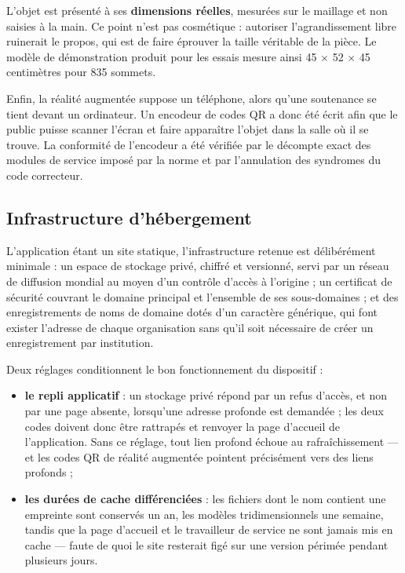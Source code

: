 L'objet est présenté à ses \textbf{dimensions réelles}, mesurées sur le maillage
et non saisies à la main. Ce point n'est pas cosmétique : autoriser
l'agrandissement libre ruinerait le propos, qui est de faire éprouver la taille
véritable de la pièce. Le modèle de démonstration produit pour les essais mesure
ainsi 45 $\times$ 52 $\times$ 45 centimètres pour 835 sommets.

Enfin, la réalité augmentée suppose un téléphone, alors qu'une soutenance se
tient devant un ordinateur. Un encodeur de codes QR a donc été écrit afin que le
public puisse scanner l'écran et faire apparaître l'objet dans la salle où il se
trouve. La conformité de l'encodeur a été vérifiée par le décompte exact des
modules de service imposé par la norme et par l'annulation des syndromes du code
correcteur.

\subsection{Infrastructure d'hébergement}

L'application étant un site statique, l'infrastructure retenue est délibérément
minimale : un espace de stockage privé, chiffré et versionné, servi par un
réseau de diffusion mondial au moyen d'un contrôle d'accès à l'origine ; un
certificat de sécurité couvrant le domaine principal et l'ensemble de ses
sous-domaines ; et des enregistrements de noms de domaine dotés d'un caractère
générique, qui font exister l'adresse de chaque organisation sans qu'il soit
nécessaire de créer un enregistrement par institution.

Deux réglages conditionnent le bon fonctionnement du dispositif :

\begin{itemize}
  \item \textbf{le repli applicatif} : un stockage privé répond par un refus
        d'accès, et non par une page absente, lorsqu'une adresse profonde est
        demandée ; les deux codes doivent donc être rattrapés et renvoyer la
        page d'accueil de l'application. Sans ce réglage, tout lien profond
        échoue au rafraîchissement — et les codes QR de réalité augmentée
        pointent précisément vers des liens profonds ;
  \item \textbf{les durées de cache différenciées} : les fichiers dont le nom
        contient une empreinte sont conservés un an, les modèles
        tridimensionnels une semaine, tandis que la page d'accueil et le
        travailleur de service ne sont jamais mis en cache — faute de quoi le
        site resterait figé sur une version périmée pendant plusieurs jours.
\end{itemize}

